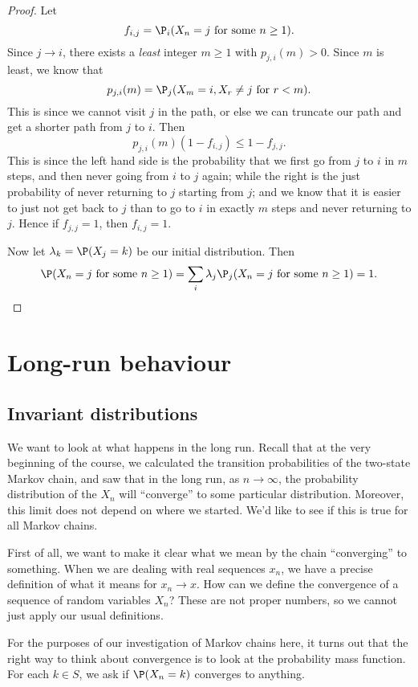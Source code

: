 \documentclass[a4paper]{article}
\begin{document}
\begin{proof}
  Let
  \[
    f_{i, j} = \P_i(X_n = j\text{ for some }n \geq 1).
  \]
  Since $j \to i$, there exists a \emph{least} integer $m \geq 1$ with $p_{j, i}(m) > 0$. Since $m$ is least, we know that
  \[
    p_{j, i}(m) = \P_j(X_m = i, X_r \not= j\text{ for }r < m).
  \]
  This is since we cannot visit $j$ in the path, or else we can truncate our path and get a shorter path from $j$ to $i$. Then
  \[
    p_{j, i}(m)(1 - f_{i, j}) \leq 1 - f_{j, j}.
  \]
  This is since the left hand side is the probability that we first go from $j$ to $i$ in $m$ steps, and then never going from $i$ to $j$ again; while the right is the just probability of never returning to $j$ starting from $j$; and we know that it is easier to just not get back to $j$ than to go to $i$ in exactly $m$ steps and never returning to $j$. Hence if $f_{j, j} = 1$, then $f_{i, j} = 1$.

  Now let $\lambda_k = \P(X_j = k)$ be our initial distribution. Then
  \[
    \P(X_n = j\text{ for some }n \geq 1) = \sum_i \lambda_j \P_j (X_n =j\text{ for some }n \geq 1) = 1.\qedhere
  \]
\end{proof}

\section{Long-run behaviour}
\subsection{Invariant distributions}
We want to look at what happens in the long run. Recall that at the very beginning of the course, we calculated the transition probabilities of the two-state Markov chain, and saw that in the long run, as $n \to \infty$, the probability distribution of the $X_n$ will ``converge'' to some particular distribution. Moreover, this limit does not depend on where we started. We'd like to see if this is true for all Markov chains.

First of all, we want to make it clear what we mean by the chain ``converging'' to something. When we are dealing with real sequences $x_n$, we have a precise definition of what it means for $x_n \to x$. How can we define the convergence of a sequence of random variables $X_n$? These are not proper numbers, so we cannot just apply our usual definitions.

For the purposes of our investigation of Markov chains here, it turns out that the right way to think about convergence is to look at the probability mass function. For each $k \in S$, we ask if $\P(X_n = k)$ converges to anything.
\end{document}
